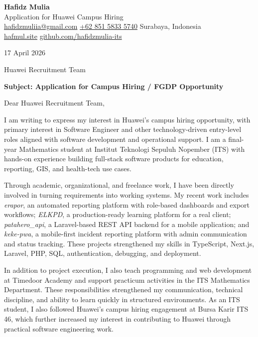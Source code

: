 \documentclass[a4paper,11pt]{article}
\begin{document}
{\LARGE\bfseries Hafidz Mulia}\\
{\color{accent}Application for Huawei Campus Hiring}\\
\href{mailto:hafidzmuliia@gmail.com}{hafidzmuliia@gmail.com} \quad\textbar\quad
\href{tel:+6285158335740}{+62 851 5833 5740} \quad\textbar\quad
Surabaya, Indonesia\\
\href{https://hafmul.site}{hafmul.site} \quad\textbar\quad
\href{https://github.com/hafidzmulia-its}{github.com/hafidzmulia-its}

\vspace{12pt}

17 April 2026

\vspace{12pt}

Huawei Recruitment Team

\vspace{12pt}

\textbf{Subject: Application for Campus Hiring / FGDP Opportunity}

\vspace{12pt}

Dear Huawei Recruitment Team,

I am writing to express my interest in Huawei's campus hiring opportunity, with primary interest in Software Engineer and other technology-driven entry-level roles aligned with software development and operational support. I am a final-year Mathematics student at Institut Teknologi Sepuluh Nopember (ITS) with hands-on experience building full-stack software products for education, reporting, GIS, and health-tech use cases.

Through academic, organizational, and freelance work, I have been directly involved in turning requirements into working systems. My recent work includes \textit{erapor}, an automated reporting platform with role-based dashboards and export workflows; \textit{ELKPD}, a production-ready learning platform for a real client; \textit{patahero\_api}, a Laravel-based REST API backend for a mobile application; and \textit{keke-pwa}, a mobile-first incident reporting platform with admin communication and status tracking. These projects strengthened my skills in TypeScript, Next.js, Laravel, PHP, SQL, authentication, debugging, and deployment.

In addition to project execution, I also teach programming and web development at Timedoor Academy and support practicum activities in the ITS Mathematics Department. These responsibilities strengthened my communication, technical discipline, and ability to learn quickly in structured environments. As an ITS student, I also followed Huawei's campus hiring engagement at Bursa Karir ITS 46, which further increased my interest in contributing to Huawei through practical software engineering work.
\end{document}
